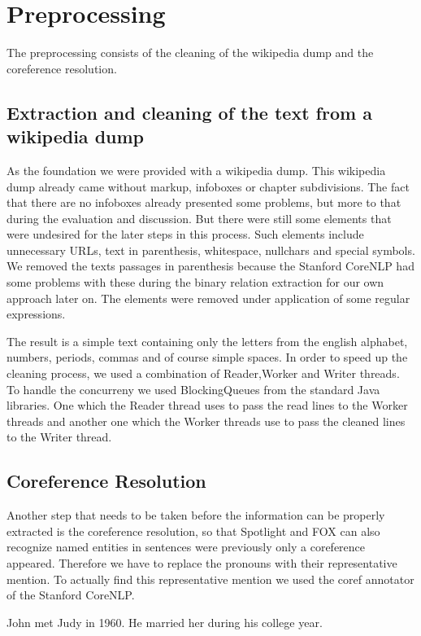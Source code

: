 \documentclass[runningheads]{llncs}
\begin{document}
\section{Preprocessing}
The preprocessing consists of the cleaning of the wikipedia dump and the coreference resolution.
\subsection{Extraction and cleaning of the text from a wikipedia dump}
As the foundation we were provided with a wikipedia dump. This wikipedia dump already came without markup, infoboxes 
or chapter subdivisions. The fact that there are no infoboxes already presented some problems, but more to that during the evaluation and discussion. But there were still some elements that were undesired for the later steps in this process. Such elements include unnecessary URLs, text in parenthesis, whitespace, nullchars and special symbols. We removed the texts passages in parenthesis because the Stanford CoreNLP had some problems with these during the binary relation extraction for our own approach later on. The elements were removed under application of some regular expressions. 
\pagebreak

The result is a simple text containing only the letters from the english alphabet, numbers, periods, commas and of course simple spaces. In order to speed up the cleaning process, we used a combination of Reader,Worker and Writer threads. To handle the concurreny we used BlockingQueues from the standard Java libraries. One which the Reader thread uses to pass the read lines to the Worker threads and another one which the Worker threads use to pass the cleaned lines to the Writer thread.


\subsection{Coreference Resolution}
Another step that needs to be taken before the information can be properly extracted is the coreference resolution, so that Spotlight and FOX can also recognize named entities in sentences were previously only a coreference appeared. Therefore we have to replace the pronouns with their representative mention. To actually find this representative mention we used the coref annotator \cite{coref} of the Stanford CoreNLP.  

\begin{example} John met Judy in 1960. He married her during his college year.\end{example}
\end{document}
